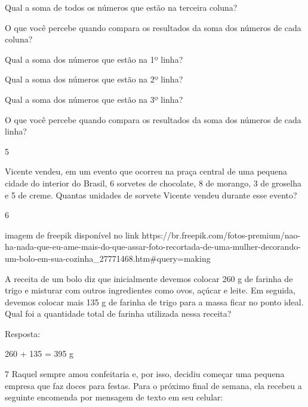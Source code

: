 \begin{escolha}
\begin{escolha}
\item
  Qual a soma de todos os números que estão na terceira coluna?

\item
  O que você percebe quando compara os resultados da soma dos números de
  cada coluna?

\item
  Qual a soma dos números que estão na 1º linha?

\item
  Qual a soma dos números que estão na 2º linha?

\item
  Qual a soma dos números que estão na 3º linha?

\item
  O que você percebe quando compara os resultados da soma dos números de
  cada linha?
\end{escolha}

\num{5}

Vicente vendeu, em um evento que ocorreu na praça central de uma pequena
cidade do interior do Brasil, 6 sorvetes de chocolate, 8 de morango, 3
de groselha e 5 de creme. Quantas unidades de sorvete Vicente vendeu durante esse evento?


\num{6}

\Inserir imagem de freepik disponível no link https://br.freepik.com/fotos-premium/nao-ha-nada-que-eu-ame-mais-do-que-assar-foto-recortada-de-uma-mulher-decorando-um-bolo-em-sua-cozinha_27771468.htm#query=making%

A receita de um bolo diz que inicialmente devemos colocar 260 g de
farinha de trigo e misturar com outros ingredientes como ovos, açúcar e
leite. Em seguida, devemos colocar mais 135 g de farinha de trigo para a
massa ficar no ponto ideal. Qual foi a quantidade total de farinha
utilizada nessa receita?


Resposta:

260 + 135 = 395 g

\num{7} Raquel sempre amou confeitaria e, por isso, decidiu começar uma pequena empresa que faz doces para festas. Para o próximo final de semana, ela
recebeu a seguinte encomenda por mensagem de texto em seu celular:


\end{escolha}
